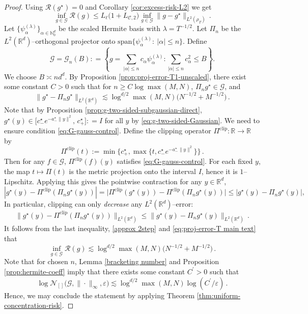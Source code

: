 \documentclass[11pt]{article}
\theoremstyle{remark}
\numberwithin{equation}{section}
\newcommand{\R}{\mathbb{R}}
\newcommand{\N}{\mathbb{N}}
\def\aStarmin{a_{-}^\star}
\def\cStarmin{c_{-}^\star}
\def\cStarmax{c_{+}^\star}
\def\clip{\mathrm{clip}}
\begin{document}
\begin{proof}
Using $\mathcal R(g^\star) = 0$ and Corollary \ref{cor:excess-risk-L2} we get
\begin{equation}
\label{approx 2step}
    \inf_{g \in \mathcal G} \mathcal{R}(g) \le L_\ell\bigl(1+L_{\mathcal C,2}\bigr) \inf_{g \in \mathcal G}  \|g-g^\star\|_{L^2(\rho_T)} \, .
\end{equation}
Let $\{\psi_\alpha^{(\lambda)}\}_{\alpha\in\N_0^d}$ be the scaled Hermite basis with $\lambda=T^{-1/2}$.  
Let $\Pi_{n}$ be the $L^2(\R^d)$--orthogonal projector onto
$\mathrm{span}\{\psi_\alpha^{(\lambda)}:\ |\alpha|\le n\}$. 
Define 
$$
\mathcal G = \mathcal G_n(B): = \left\{g = \sum_{|\alpha| \le n} c_\alpha \psi_\alpha^{(\lambda)}: \sum_{|\alpha| \le n} c_\alpha^2 \le B\right\}.
$$ 
We choose $B \asymp n d^d$. By Proposition \ref{prop:proj-error-T1-unscaled}, there exist some constant $C > 0$ such that for $n \geq C \log \max(M, N)$, $\Pi_{n}g^\star \in \mathcal G$, and
\begin{equation}\label{eq:proj-error-T main text}
\|g^\star-\Pi_{n}g^\star\|_{L^2(\R^d)}
 \lesssim 
\log^{d/2} \max(M, N) \Big(N^{-1/2} + M^{-1/2} \Big)\, .
\end{equation}
Note that by Proposition \ref{prop:g-two-sided-subgaussian-direct}, $g^\star(y)\in\big[\cStarmin e^{-\aStarmin\|y\|^2},\,\cStarmax \big]: = I$ for all $y$ by
\eqref{eq:g-two-sided-Gaussian}. We need to ensure condition \eqref{eq:G-gauss-control}. Define the clipping operator $\Pi^\clip:\R\to\R$ by 
$$
\Pi^\clip(t):=
  \min\Big\{\cStarmax,\max\big\{t,\cStarmin e^{-\aStarmin\|y\|^2} \big\}\Big\}\,. 
$$ 
Then for any $f \in \mathcal G$, $\Pi^\clip(f)(y)$ satisfies \eqref{eq:G-gauss-control}. For each fixed $y$, the map
$t\mapsto \Pi(t)$ is the metric projection onto the interval
$I$, hence it is $1$--Lipschitz. 
Applying this  gives the pointwise contraction for any $y\in\R^d$, 
\begin{equation*}
  |g^\star(y)-\Pi^\clip(\Pi_{n}g^\star(y))|
  =
  \big|\Pi^\clip (g^\star(y)) - \Pi^\clip(\Pi_{n}g^\star(y))\big|
  \le
  |g^\star(y)-\Pi_{n}g^\star(y)|,
  \qquad 
\end{equation*}
In particular, clipping can only \emph{decrease} any $L^2(
\R^d)$--error: 
\[
  \|g^\star(y)-\Pi^\clip(\Pi_{n}g^\star(y))\|_{L^2(\R^d)}
  \le
  \|g^\star(y)-\Pi_{n}g^\star(y)\|_{L^2(\R^d)}\, .
\]
It follows from the last inequality, \eqref{approx 2step} and \eqref{eq:proj-error-T main text} that 
$$
\inf_{g \in \mathcal G} \mathcal{R}(g) \lesssim \log^{d/2} \max(M, N) \Big(N^{-1/2} + M^{-1/2} \Big)\, . 
$$
Note that for chosen $n$, Lemma \ref{bracketing number} and Proposition \ref{prop:hermite-coeff} imply that there exists some constant $C^\prime >0$ such that
$$
\log \mathcal N_{[]}\!\Big(\mathcal G,\|\cdot\|_\infty, \varepsilon \Big) \lesssim \log^{d/2} \max(M, N) \log(C^\prime/\varepsilon)\, .
$$ 
Hence, we may conclude the statement by applying Theorem \ref{thm:uniform-concentration-risk}.
\end{proof}
 
\end{document}
